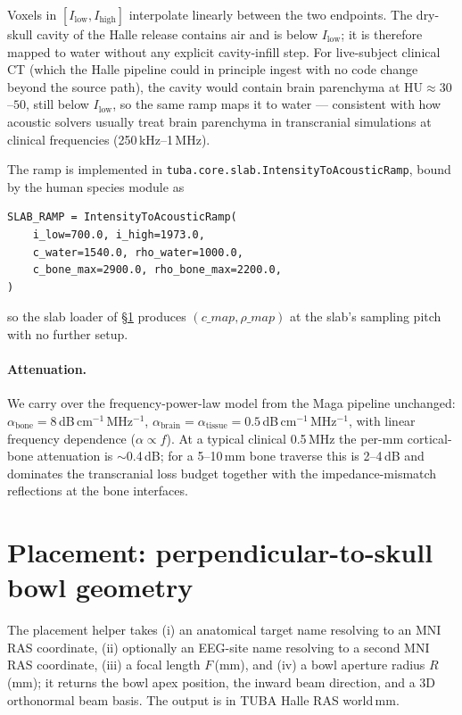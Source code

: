 \documentclass{compactarticle}
\begin{document}
Voxels in $[I_\mathrm{low}, I_\mathrm{high}]$ interpolate linearly
between the two endpoints. The dry-skull cavity of the Halle release
contains air and is below $I_\mathrm{low}$; it is therefore mapped to
water without any explicit cavity-infill step. For live-subject
clinical CT (which the Halle pipeline could in principle ingest with
no code change beyond the source path), the cavity would contain brain
parenchyma at $\mathrm{HU}\approx 30$--$50$, still below $I_\mathrm{low}$,
so the same ramp maps it to water --- consistent with how acoustic
solvers usually treat brain parenchyma in transcranial simulations at
clinical frequencies (250\,kHz--1\,MHz).

The ramp is implemented in
\texttt{tuba.core.slab.IntensityToAcousticRamp}, bound by the human
species module as

\begin{verbatim}
SLAB_RAMP = IntensityToAcousticRamp(
    i_low=700.0, i_high=1973.0,
    c_water=1540.0, rho_water=1000.0,
    c_bone_max=2900.0, rho_bone_max=2200.0,
)
\end{verbatim}

so the slab loader of \S\ref{sec:placement} produces $(c\_map,
\rho\_map)$ at the slab's sampling pitch with no further setup.

\paragraph{Attenuation.}
We carry over the frequency-power-law model from the Maga pipeline
unchanged: $\alpha_\mathrm{bone} = 8$\,dB\,cm$^{-1}$\,MHz$^{-1}$,
$\alpha_\mathrm{brain} = \alpha_\mathrm{tissue} =
0.5$\,dB\,cm$^{-1}$\,MHz$^{-1}$, with linear frequency dependence
($\alpha \propto f$). At a typical clinical 0.5\,MHz the per-mm
cortical-bone attenuation is $\sim$0.4\,dB; for a 5--10\,mm bone
traverse this is 2--4\,dB and dominates the transcranial loss budget
together with the impedance-mismatch reflections at the bone
interfaces.

\section{Placement: perpendicular-to-skull bowl
geometry}\label{sec:placement}
The placement helper takes (i) an anatomical target name resolving to
an MNI RAS coordinate, (ii) optionally an EEG-site name resolving to a
second MNI RAS coordinate, (iii) a focal length $F$\,(mm), and (iv) a
bowl aperture radius $R$\,(mm); it returns the bowl apex position,
the inward beam direction, and a 3D orthonormal beam basis. The
output is in TUBA Halle RAS world\,mm.
\end{document}
